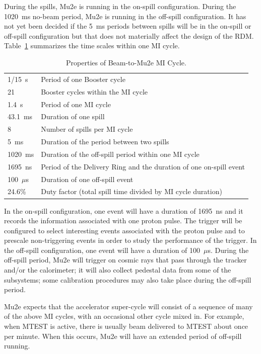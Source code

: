 During the spills, Mu2e is running in the on-spill configuration.
During the 1020~ms no-beam period, Mu2e is running in the off-spill configuration.
It has not yet been decided if the 5~ms periods between spills will
be in the on-spill or off-spill configuration
but that does not materially affect the design of the RDM.
Table~\ref{tab:timescales} summarizes the time scales within one MI cycle.
\begin{table}
\begin{center}
\caption[Properties of the Beam-to-Mu2e MI Cycle]{Properties of Beam-to-Mu2e MI Cycle.}
\label{tab:timescales}
\begin{tabular}{ll}\hline
   1/15~s & Period of one Booster cycle \\
   21     & Booster cycles within the MI cycle \\
   1.4~s  & Period of one MI cycle \\
   43.1~ms & Duration of one spill \\
   8       & Number of spills per MI cycle \\
    5~ms   & Duration of the period between two spills \\
   1020~ms & Duration of the off-spill period within one MI cycle \\
   1695~ns & Period of the Delivery Ring and the duration of one on-spill event\\
   100~$\mu$s & Duration of one off-spill event \\
   24.6\%     & Duty factor (total spill time divided by MI cycle duration)\\
   \hline
  \end{tabular}
\end{center}
\end{table}


In the on-spill configuration, one event will have  a duration of 1695~ns
and it records the information associated with one proton pulse.
The trigger will be configured to select interesting events associated with the proton pulse
and to prescale non-triggering events in order to study the performance of the trigger.
In the off-spill configuration, one event will have a duration of 100~$\mu$s.
During the off-spill period, Mu2e will trigger on cosmic rays that
pass through the tracker and/or the calorimeter; it will also collect
pedestal data from some of the subsystems; some calibration procedures
may also take place during the off-spill period.

Mu2e expects that the accelerator super-cycle will consist of a
sequence of many of the above MI cycles,
with an occasional other cycle mixed in.
For example, when MTEST is active, there is usually beam delivered to MTEST about once per minute.
When this occurs, Mu2e will have an extended period of off-spill running.

